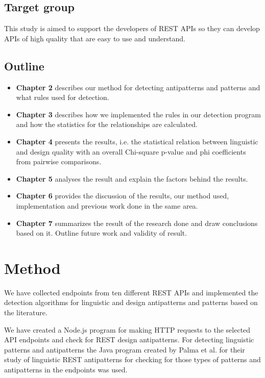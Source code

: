 \documentclass[a4paper,12pt]{article}
\begin{document}
\subsection{Target group}
This study is aimed to support the developers of REST APIs so they can develop APIs of high quality that are easy to use and understand. 

\subsection{Outline}

\begin{itemize}
\item \textbf{Chapter 2} describes our method for detecting antipatterns and patterns and what rules used for detection.
\item \textbf{Chapter 3} describes how we implemented the rules in our detection program and how the statistics for the relationships are calculated.
\item \textbf{Chapter 4} presents the results, i.e. the statistical relation between linguistic and design quality with an overall Chi-square p-value and phi coefficients from pairwise comparisons.
\item \textbf{Chapter 5} analyses the result and explain the factors behind the results.
\item \textbf{Chapter 6} provides the discussion of the results, our method used, implementation and previous work done in the same area.
\item \textbf{Chapter 7} summarizes the result of the research done and draw conclusions based on it. Outline future work and validity of result.
\end{itemize}
\newpage

\section{Method}
\label{Method}

We have collected endpoints from ten different REST APIs and implemented the detection algorithms for linguistic and design antipatterns and patterns based on the literature. 

We have created a Node.js program for making HTTP requests to the selected API endpoints and check for REST design antipatterns. For detecting linguistic patterns and antipatterns the Java program created by Palma et al. for their study of linguistic REST antipatterns \cite{linguistic} for checking for those types of patterns and antipatterns in the endpoints was used. 
\end{document}
